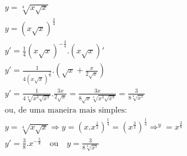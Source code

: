 \begin{ex}
\begin{align}
&y=\sqrt[4]{x\sqrt{x}}\nonumber\\
&y=(x\sqrt{x})^\frac{3}{4}\nonumber\\
&y'=\frac{1}{4}(x\sqrt{x})^{-\frac{3}{4}}.(x\sqrt{x})'\nonumber\\
&y'=\frac{1}{4(x\sqrt{x})^\frac{3}{4}}.\left(\sqrt{x}+\frac{x}{2\sqrt{x}}\right)\nonumber\\
&y'=\frac{1}{4\sqrt[4]{x^3\sqrt{x^3}}}.\frac{3x}{2\sqrt{x}}=\frac{3x}{8\sqrt{x}{\sqrt[4]{x^3\sqrt{x^3}}}}=\frac{3}{8\sqrt[8]{x^5}}\nonumber\\
&\text{ou, de uma maneira mais simples:}\nonumber\\
&y=\sqrt[4]{x\sqrt{x}}\Rightarrow y=\left(x.x^\frac{1}{2}\right)^\frac{1}{4}=\left(x^\frac{3}{2}\right)^\frac{1}{4}\Rightarrow^y=x^\frac{3}{8}\nonumber\\
&y'=\frac{3}{8}.x^{-\frac{5}{8}}\quad\text{ou}\quad y=\frac{3}{8\sqrt[8]{x^5}}\nonumber
\end{align}
\end{ex}